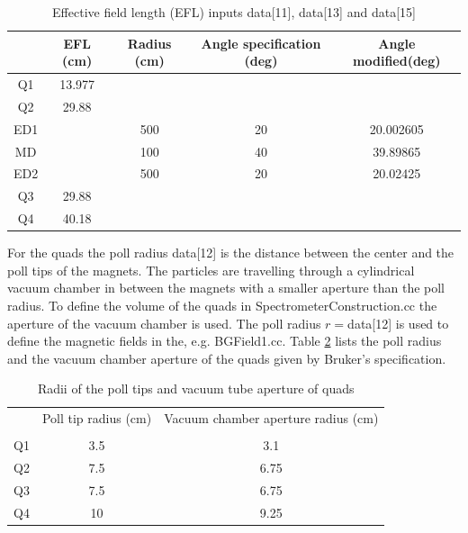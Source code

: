 \documentclass[letter,11pt]{article}
\newcommand{\filefont}[1]{{\scriptsize\ttfamily\selectfont #1}\xspace}
\begin{document}
\begin{table}
\caption{Effective field length (EFL) inputs \filefont{data[11]}, \filefont{data[13]} and \filefont{data[15]}}\label{tab:efl}
\centering
\begin{tabular}{ccccc}
\hline
	&EFL (cm)	&Radius (cm)	&Angle specification (deg)	&Angle modified(deg)\\
\hline
Q1	&13.977		&&&\\
Q2	&29.88		&&&\\
ED1	&			&500			&20			&20.002605\\
MD	&			&100			&40			&39.89865\\
ED2	&			&500			&20			&20.02425\\
Q3	&29.88		&&&\\
Q4	&40.18		&&&\\
\end{tabular}
\end{table}

For the quads the poll radius \filefont{data[12]} is the distance between the center and the poll tips of the magnets. The particles are travelling through a cylindrical vacuum chamber in between the magnets with a smaller aperture than the poll radius. To define the volume of the quads in SpectrometerConstruction.cc the aperture of the vacuum chamber is used. The poll radius $r=$\filefont{data[12]} is used to define the magnetic fields in the, e.g. BGField1.cc. Table \ref{tab:poll} lists the poll radius and the vacuum chamber aperture of the quads given by Bruker's specification.

\begin{table}
\caption{Radii of the poll tips and vacuum tube aperture of quads}\label{tab:poll}
\centering
\begin{tabular}{ccc}
\hline
	&Poll tip radius (cm)	&Vacuum chamber aperture radius (cm)\\\\
\hline
Q1	&3.5		&3.1\\
Q2	&7.5		&6.75\\
Q3	&7.5		&6.75\\
Q4	&10		&9.25\\
\end{tabular}
\end{table}
\end{document}

